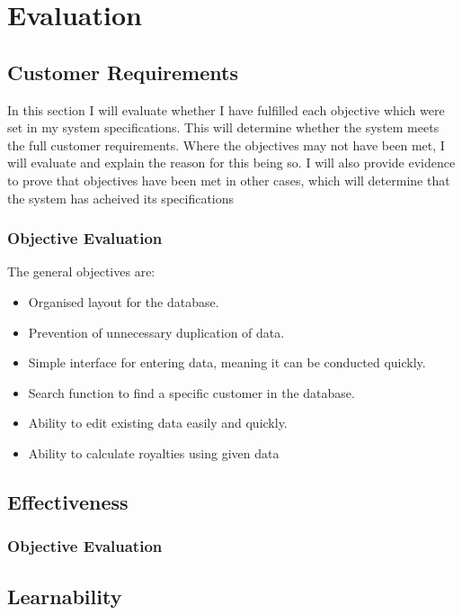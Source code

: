 \chapter{Evaluation}

\section{Customer Requirements}

In this section I will evaluate whether I have fulfilled each objective which were set in my system specifications. This will determine whether the system meets the full customer requirements. Where the objectives may not have been met, I will evaluate and explain the reason for this being so. I will also provide evidence to prove that objectives have been met in other cases, which will determine that the system has acheived its specifications

\subsection{Objective Evaluation}

The general objectives are:
\begin{itemize}
    \item Organised layout for the database.
    \item Prevention of unnecessary duplication of data.
    \item Simple interface for entering data, meaning it can be conducted quickly.
    \item Search function to find a specific customer in the database.
    \item Ability to edit existing data easily and quickly.
    \item Ability to calculate royalties using given data
\end{itemize}


\section{Effectiveness}

\subsection{Objective Evaluation}

\section{Learnability}

